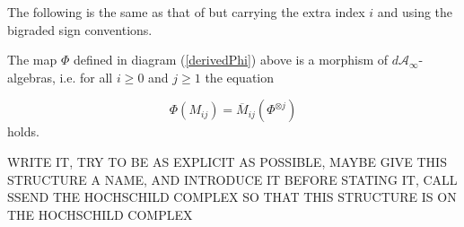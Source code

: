 \documentclass[Thesis.tex]{subfiles}
\begin{document}
The following is the same as that of  but carrying the extra index $i$ and using the bigraded sign conventions.
\begin{thm}\label{bigradedtheorem}
The map $\Phi$ defined in diagram (\ref{derivedPhi}) above is a morphism of $d\mathcal{A}_\infty$-algebras, i.e. for all $i\geq 0$ and $j\geq 1$ the equation

\[\Phi(M_{ij})=\overline{M}_{ij}(\Phi^{\otimes j})\]
holds.%
\end{thm}

\begin{corollary}\label{dainftydeligne}
WRITE IT, TRY TO BE AS EXPLICIT AS POSSIBLE, MAYBE GIVE THIS STRUCTURE A NAME, AND INTRODUCE IT BEFORE STATING IT, CALL SSEND THE HOCHSCHILD COMPLEX SO THAT THIS STRUCTURE IS ON THE HOCHSCHILD COMPLEX
\end{corollary}
\end{document}
